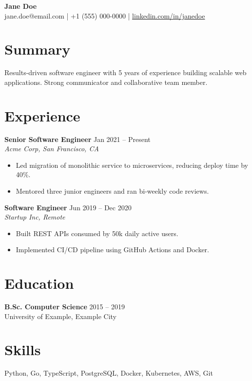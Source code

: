 \documentclass[11pt,a4paper]{article}
\begin{document}
\begin{center}
    {\LARGE \textbf{Jane Doe}} \\[4pt]
    jane.doe@email.com \quad | \quad +1 (555) 000-0000 \quad | \quad
    \href{https://linkedin.com/in/janedoe}{linkedin.com/in/janedoe}
\end{center}

\section{Summary}
Results-driven software engineer with 5 years of experience building
scalable web applications. Strong communicator and collaborative team member.

\section{Experience}

\textbf{Senior Software Engineer} \hfill Jan 2021 -- Present \\
\textit{Acme Corp, San Francisco, CA}
\begin{itemize}[nosep, left=0pt]
    \item Led migration of monolithic service to microservices, reducing
          deploy time by 40\%.
    \item Mentored three junior engineers and ran bi-weekly code reviews.
\end{itemize}

\textbf{Software Engineer} \hfill Jun 2019 -- Dec 2020 \\
\textit{Startup Inc, Remote}
\begin{itemize}[nosep, left=0pt]
    \item Built REST APIs consumed by 50k daily active users.
    \item Implemented CI/CD pipeline using GitHub Actions and Docker.
\end{itemize}

\section{Education}
\textbf{B.Sc. Computer Science} \hfill 2015 -- 2019 \\
University of Example, Example City

\section{Skills}
Python, Go, TypeScript, PostgreSQL, Docker, Kubernetes, AWS, Git
\end{document}

